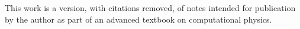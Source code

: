 This work is a version, with citations removed, of notes
intended for publication by the author as part of an advanced
textbook on computational physics.
